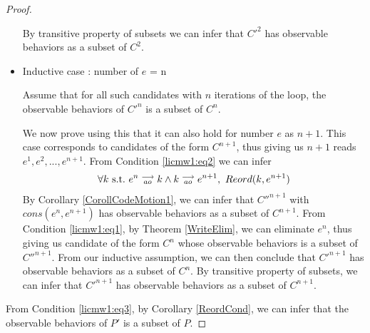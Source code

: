 \begin{proof}
\begin{itemize}
        
        By transitive property of subsets we can infer that $C'^2$ has observable behaviors as a subset of $C^2$.
        
        \item Inductive case : number of $e$ = n

        Assume that for all such candidates with $n$ iterations of the loop, the observable behaviors of $C'^n$ is a subset of $C^n$.

        We now prove using this that it can also hold for number $e$ as $n + 1$. 
        This case corresponds to candidates of the form $C^{n+1}$, thus giving us $n+1$ reads $e^1, e^2,...,e^{n+1}$.
        From Condition \ref{licmw1:eq2} we can infer 
        \begin{align*}
            \forall k \ \text{s.t.} \ e^n\stackrel{\longrightarrow}{_{ao}}k \wedge k\stackrel{\longrightarrow}{_{ao}}e^{n+1}, \ Reord(k,e^{n+1})
        \end{align*}
        By Corollary \ref{CorollCodeMotion1}, we can infer that $C''^{n+1}$ with $cons(e^n, e^{n+1})$ has observable behaviors as a subset of $C^{n+1}$. 
        From Condition \ref{licmw1:eq1}, by Theorem \ref{WriteElim}, we can eliminate $e^{n}$, thus giving us candidate of the form $C^n$ whose observable behaviors is a subset of $C''^{n+1}$.
        From our inductive assumption, we can then conclude that $C'^{n+1}$ has observable behaviors as a subset of $C^n$. 
        By transitive property of subsets, we can infer that $C'^{n+1}$ has observable behaviors as a subset of $C^{n+1}$.


    \end{itemize}

    From Condition \ref{licmw1:eq3}, by Corollary \ref{ReordCond}, we can infer that the observable behaviors of $P'$ is a subset of $P$.

\end{proof}


